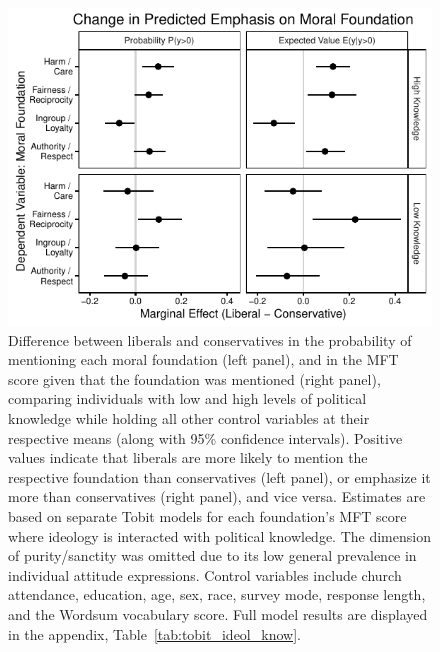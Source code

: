 \documentclass[12pt]{article}
\begin{document}
\begin{figure}[ht]\centering
\includegraphics{../calc/fig/tobit_ideol_know.pdf}
\caption{Difference between liberals and conservatives in the probability of mentioning each moral foundation (left panel), and in the MFT score given that the foundation was mentioned (right panel), comparing individuals with low and high levels of political knowledge while holding all other control variables at their respective means (along with 95\% confidence intervals). Positive values indicate that liberals are more likely to mention the respective foundation than conservatives (left panel), or emphasize it more than conservatives (right panel), and vice versa. Estimates are based on separate Tobit models for each foundation's MFT score where ideology is interacted with political knowledge. The dimension of purity/sanctity was omitted due to its low general prevalence in individual attitude expressions. Control variables include church attendance, education, age, sex, race, survey mode, response length, and the Wordsum vocabulary score. Full model results are displayed in the appendix, Table~\ref{tab:tobit_ideol_know}.}\label{fig:tobit_ideol_know}
\end{figure}
\end{document}
